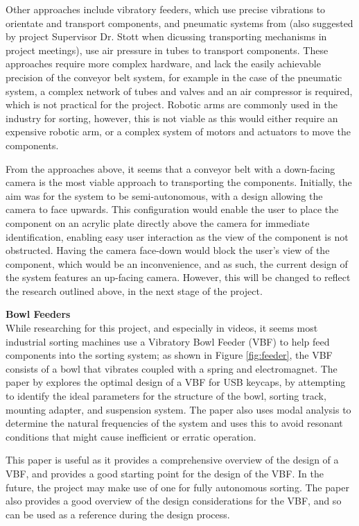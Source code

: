 Other approaches include vibratory feeders\cite{s21217280}, which use precise vibrations to orientate and transport components, and pneumatic systems from \citet{ASEC2023-16267} (also suggested by project Supervisor Dr. Stott when dicussing transporting mechanisms in project meetings), use air pressure in tubes to transport components.
These approaches require more complex hardware, and lack the easily achievable precision of the conveyor belt system, for example in the case of the pneumatic system, a complex network of tubes and valves and an air compressor
is required, which is not practical for the project. Robotic arms are commonly used in the industry for sorting, however, this is not viable as this would either require an expensive robotic arm, or a complex system of motors and actuators to move the components.

From the approaches above, it seems that a conveyor belt with a down-facing camera is the most viable approach to transporting the components. Initially, the aim was for the system to be semi-autonomous, with a design allowing the camera to face upwards.
This configuration would enable the user to place the component on an acrylic plate directly above the camera for immediate identification, enabling easy user interaction as the view of the component is not obstructed. 
Having the camera face-down would block the user's view of the component, which would be an inconvenience, and as such, the current design of the system features an up-facing camera. However, 
this will be changed to reflect the research outlined above, in the next stage of the project.

\noindent
\textbf{Bowl Feeders} \\
While researching for this project, and especially in videos\cite{videobowlfeeder}, it seems most industrial sorting machines use a Vibratory Bowl Feeder (VBF) to help feed components into the sorting system;
as shown in Figure \ref{fig:feeder}, the VBF consists of a bowl that vibrates coupled with a spring and electromagnet.
The paper by \citet{nam2019design} explores the optimal design of a VBF for USB keycaps, by attempting to identify the ideal parameters for the structure of the bowl,
sorting track, mounting adapter, and suspension system. The paper also uses modal analysis to determine the natural frequencies of the system and uses this to
avoid resonant conditions that might cause inefficient or erratic operation.

This paper is useful as it provides a comprehensive overview of the design of a VBF, and provides a good starting point for the design of the VBF. In the future,
the project may make use of one for fully autonomous sorting. The paper also provides a good overview of the design considerations for the VBF, and so can be used as a reference
during the design process.


